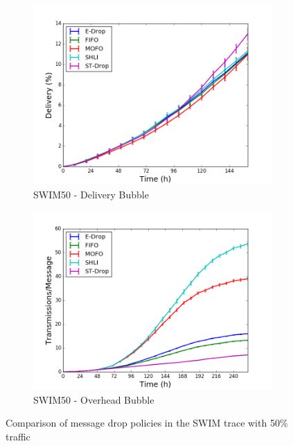 \begin{figure}
    \begin{subfigure}[b]{0.5\columnwidth}
        \includegraphics[width=\linewidth]{imgs/swim/50/BubbleRap-delivery.png}
        \caption{SWIM50 - Delivery Bubble}
        \label{fig:swim50BubbleDel}
    \end{subfigure}
    \begin{subfigure}[b]{0.5\columnwidth}
        \includegraphics[width=\linewidth]{imgs/swim/50/BubbleRap-overhead.png}
        \caption{SWIM50 - Overhead Bubble}
        \label{fig:swim50BubbleOver}
    \end{subfigure}

    \caption{Comparison of message drop policies in the SWIM trace with 50\% traffic}
    \label{fig:swim50}
\end{figure}

